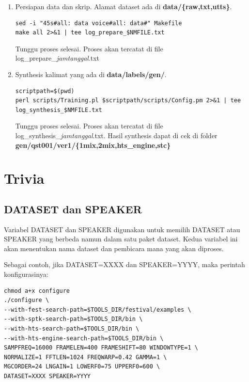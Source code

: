 \documentclass[12pt,]{article}
\begin{document}
\begin{enumerate}
		\item Persiapan data dan skrip.
		Alamat dataset ada di \textbf{data/\{raw,txt,utts\}}.
		\begin{verbatim}
sed -i "45s#all: data voice#all: data#" Makefile
make all 2>&1 | tee log_prepare_$NMFILE.txt
		\end{verbatim}

		Tunggu proses selesai.
		Proses akan tercatat di file log\_prepare\_\textit{jamtanggal}.txt

		\item Synthesis kalimat yang ada di \textbf{data/labels/gen/}.
		\begin{verbatim}
scriptpath=$(pwd)
perl scripts/Training.pl $scriptpath/scripts/Config.pm 2>&1 | tee log_synthesis_$NMFILE.txt
		\end{verbatim}

		Tunggu proses selesai.
		Proses akan tercatat di file log\_synthesis\_\textit{jamtanggal}.txt.
		Hasil synthesis dapat di cek di folder \textbf{gen/qst001/ver1/\{1mix,2mix,hts\_engine,stc\}}

	\end{enumerate}

	\newpage
	\mbox{}

	\newpage
	\section{Trivia}

	\subsection{DATASET dan SPEAKER}

	Variabel DATASET dan SPEAKER digunakan untuk memilih DATASET atau SPEAKER yang berbeda namun dalam satu paket dataset.
	Kedua variabel ini akan menentukan nama dataset dan pembicara mana yang akan diproses.

	Sebagai contoh, jika DATASET=XXXX dan SPEAKER=YYYY, maka perintah konfigurasinya:

	\begin{verbatim}
chmod a+x configure
./configure \
--with-fest-search-path=$TOOLS_DIR/festival/examples \
--with-sptk-search-path=$TOOLS_DIR/bin \
--with-hts-search-path=$TOOLS_DIR/bin \
--with-hts-engine-search-path=$TOOLS_DIR/bin \
SAMPFREQ=16000 FRAMELEN=400 FRAMESHIFT=80 WINDOWTYPE=1 \
NORMALIZE=1 FFTLEN=1024 FREQWARP=0.42 GAMMA=1 \
MGCORDER=24 LNGAIN=1 LOWERF0=75 UPPERF0=600 \
DATASET=XXXX SPEAKER=YYYY
	\end{verbatim}
\end{document}
